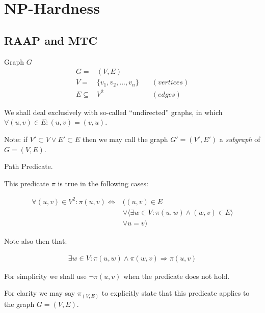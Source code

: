\section{NP-Hardness}

\subsection{RAAP and MTC}

\begin{definition}
Graph $G$
\begin{align}
	\nonumber G = & (V,E) \\
	\nonumber V = & \{v_1, v_2, ..., v_n\} \quad & (vertices)\\
	\nonumber E \subseteq & V^2 & (edges)
\end{align}

We shall deal exclusively with so-called ``undirected'' graphs, in which $\forall (u,v) \in E : (u,v) = (v,u)$.

Note: if $V' \subset V \vee E' \subset E$ then we may call the graph $G'=(V',E')$ a \emph{subgraph} of $G=(V,E)$.
\end{definition}

\begin{definition}
Path Predicate.

This predicate $\pi$ is true in the following cases:

\begin{align}
	\nonumber \forall (u,v) \in V^2 : \pi(u, v) \Leftrightarrow & ( (u, v) \in E \\
	\nonumber & \vee \langle \exists w \in V : \pi(u, w) \wedge (w, v) \in E \rangle \\
	\nonumber & \vee u = v )
\end{align}

Note also then that:

\begin{align}
	\nonumber \exists w \in V : \pi(u, w) \wedge \pi(w, v) \Rightarrow \pi(u, v)
\end{align}

For simplicity we shall use $\neg\pi(u, v)$ when the predicate does not hold.

For clarity we may say $\pi_{(V,E)}$ to explicitly state that this predicate applies to the graph $G=(V,E)$.

\end{definition}

